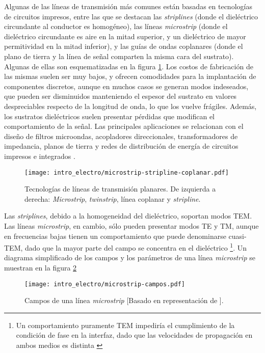 Algunas de las líneas de transmisión más comunes están basadas en tecnologías de circuitos impresos, entre las que se destacan las \textit{striplines} (donde el dieléctrico circundante al conductor es homogéneo), las líneas \textit{microstrip} (donde el dieléctrico circundante es aire en la mitad superior, y un dieléctrico de mayor permitividad en la mitad inferior), y las guías de ondas coplanares (donde el plano de tierra y la línea de señal comparten la misma cara del sustrato). Algunas de ellas son esquematizadas en la figura \ref{fig:strip-line-technology}. Los costos de fabricación de las mismas suelen ser muy bajos, y ofrecen comodidades para la implantación de componentes discretos, aunque en muchos casos se generan modos indeseados, que pueden ser disminuidos manteniendo el espesor del sustrato en valores despreciables respecto de la longitud de onda, lo que los vuelve frágiles. Además, los sustratos dieléctricos suelen presentar pérdidas que modifican el comportamiento de la señal. Las principales aplicaciones se relacionan con el diseño de filtros microondas, acopladores direccionales, transformadores de impedancia, planos de tierra y redes de distribución de energía de circuitos impresos e integrados \cite{Venkateswaran:Thesis}.


\begin{figure}[htp]
	\centering
	\texttt{[image: intro\_electro/microstrip-stripline-coplanar.pdf]}
	\caption{Tecnologías de líneas de transmisión planares. De izquierda a derecha: \textit{Microstrip}, \textit{twinstrip}, línea coplanar y \textit{stripline}.}
	\label{fig:strip-line-technology}
\end{figure}

Las \textit{striplines}, debido a la homogeneidad del dieléctrico, soportan modos TEM. Las líneas \textit{microstrip}, en cambio, sólo pueden presentar modos TE y TM, aunque en frecuencias bajas tienen un comportamiento que puede denominarse cuasi-TEM, dado que la mayor parte del campo se concentra en el dieléctrico \footnote{Un comportamiento puramente TEM impediría el cumplimiento de la condición de fase en la interfaz, dado que las velocidades de propagación en ambos medios es distinta \cite{Pozar:MwEngineering}}. Un diagrama simplificado de los campos y los parámetros de una línea \textit{microstrip} se muestran en la figura \ref{fig:microstrip-campos}


\begin{figure}[htp]
	\centering
	\texttt{[image: intro\_electro/microstrip-campos.pdf]}
	\caption{Campos de una línea \textit{microstrip} [Basado en representación de \cite{Pozar:MwEngineering}].}
	\label{fig:microstrip-campos}
\end{figure}

